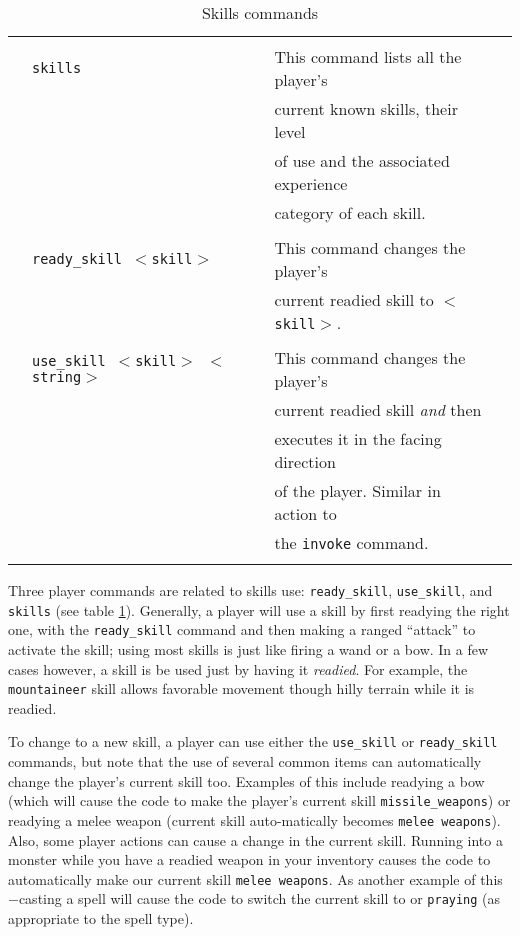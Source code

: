 \begin{table}
\small
\caption{Skills commands}\label{tab:skill_cmd}
\vskip 12pt
\begin{center}
\begin{tabular}{|cllc|} \hline
 & & & \\
 & {\tt skills} & 	This command lists all the player's & \\
 &		& current known skills, their level & \\
 &		& of use and the associated experience & \\
 &		& category of each skill. & \\
 & & & \\
 & {\tt ready\_skill $<$skill$>$} 	& This command changes the player's & \\
  &				& current readied skill to {\tt $<$skill$>$}. &  \\
 & & & \\
 & {\tt use\_skill $<$skill$>$ $<$string$>$}  & This command changes the player's & \\
 &				& current readied skill {\em and} then & \\
  & 				& executes it in the facing direction & \\
 &				& of the player. Similar in action to & \\
 &				& the {\tt invoke} command. & \\
 & & & \\ \hline
\end{tabular}
\end{center}
\end{table}

Three player commands are related to skills use: {\tt ready\_skill},
{\tt use\_skill}, and {\tt skills} (see table \ref{tab:skill_cmd}).
Generally, a player will use a skill by first readying the right one,
with the {\tt ready\_skill} command and then making a ranged ``attack'' to
activate the skill; using most skills is just like firing a wand or a
bow.  In a few cases however, a skill is be used just by having it
{\em readied}. For example, the {\tt mountaineer} skill allows
favorable movement though hilly terrain while it is readied.

To change to a new skill, a player can use either the
{\tt use\_skill} or {\tt ready\_skill} commands, but note that the use of
several common items can automatically change the player's current
skill too. Examples of this include readying a bow (which will cause the
code to make the player's current skill {\tt missile\_weapons}) or readying
a melee weapon (current skill auto-matically becomes {\tt melee weapons}).
Also, some player actions can cause a change in the current skill.
Running into a monster while you have a readied weapon in your inventory
causes the code to automatically make our current skill {\tt melee weapons}.
As another example of this$-$casting a spell will cause the code to
switch the current skill to {\tt \spellcasting} or {\tt praying} (as appropriate
to the spell type).

